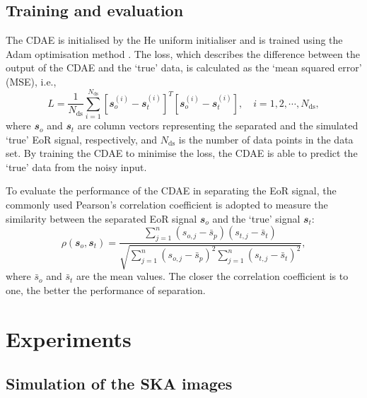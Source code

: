\documentclass[letters,a4paper,fleqn,usenatbib]{mnras}
\newcommand{\R}[1]{\mathrm{#1}}
\newcommand{\B}[1]{\mathbfit{#1}}
\begin{document}
\subsection{Training and evaluation}
\label{sec:train-eval}

The CDAE is initialised by the He uniform initialiser \citep{he2015}
and is trained using the Adam optimisation method \citep{kingma2015}.
The loss, which describes the difference between the output of the CDAE
and the `true' data, is calculated as the `mean squared error' (MSE),
i.e.,
\begin{equation}
  \label{eq:loss}
  L = \frac{1}{N_{\R{ds}}} \sum_{i=1}^{N_{\R{ds}}}
    \left[ \B{s}_o^{(i)} - \B{s}_t^{(i)} \right]^T
    \left[ \B{s}_o^{(i)} - \B{s}_t^{(i)} \right],
    \quad i = 1, 2, \cdots, N_{\R{ds}},
\end{equation}
where
$\B{s}_o$ and $\B{s}_t$ are column vectors representing the separated
and the simulated `true' EoR signal, respectively,
and $N_{\R{ds}}$ is the number of data points in the data set.
By training the CDAE to minimise the loss, the CDAE is able to predict
the `true' data from the noisy input.

To evaluate the performance of the CDAE in separating the EoR signal,
the commonly used Pearson's correlation coefficient
\citep[e.g.,][]{harker2009,chapman2013}
is adopted to measure the similarity between the separated EoR signal
$\B{s}_o$ and the `true' signal $\B{s}_t$:
\begin{equation}
  \label{eq:corrcoef}
  \rho(\B{s}_o, \B{s}_t) =
    \frac{\sum_{j=1}^{n}(s_{o,j}-\bar{s}_p)(s_{t,j}-\bar{s}_t)}{
      \sqrt{\sum_{j=1}^{n}(s_{o,j}-\bar{s}_p)^2
        \sum_{j=1}^{n}(s_{t,j}-\bar{s}_t)^2}
    },
\end{equation}
where $\bar{s}_o$ and $\bar{s}_t$ are the mean values.
The closer the correlation coefficient is to one, the better the
performance of separation.


\section{Experiments}
\label{sec:experiments}

\subsection{Simulation of the SKA images}
\label{sec:simulation}
\end{document}
